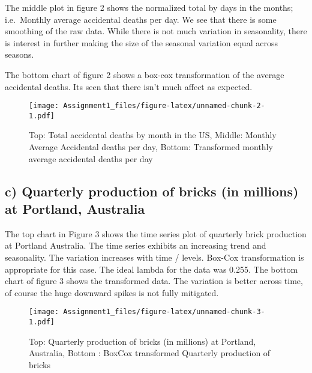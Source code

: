 \documentclass[]{article}
\begin{document}
The middle plot in figure 2 shows the normalized total by days in the
months; i.e.~Monthly average accidental deaths per day. We see that
there is some smoothing of the raw data. While there is not much
variation in seasonality, there is interest in further making the size
of the seasonal variation equal across seasons.

The bottom chart of figure 2 shows a box-cox transformation of the
average accidental deaths. Its seen that there isn't much affect as
expected.

\begin{figure}
\centering
\texttt{[image: Assignment1\_files/figure-latex/unnamed-chunk-2-1.pdf]}
\caption{Top: Total accidental deaths by month in the US, Middle:
Monthly Average Accidental deaths per day, Bottom: Transformed monthly
average accidental deaths per day}
\end{figure}

\subsection{c) Quarterly production of bricks (in millions) at Portland,
Australia}\label{c-quarterly-production-of-bricks-in-millions-at-portland-australia}

The top chart in Figure 3 shows the time series plot of quarterly brick
production at Portland Australia. The time series exhibits an increasing
trend and seasonality. The variation increases with time / levels.
Box-Cox transformation is appropriate for this case. The ideal lambda
for the data was 0.255. The bottom chart of figure 3 shows the
transformed data. The variation is better across time, of course the
huge downward spikes is not fully mitigated.

\begin{figure}
\centering
\texttt{[image: Assignment1\_files/figure-latex/unnamed-chunk-3-1.pdf]}
\caption{Top: Quarterly production of bricks (in millions) at Portland,
Australia, Bottom : BoxCox transformed Quarterly production of bricks}
\end{figure}
\end{document}
